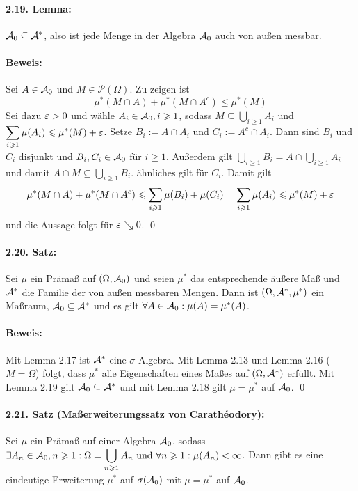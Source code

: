 \paragraph{2.19. Lemma:}$\mathcal{A}_0\subseteq \mathcal{A}^*$, also ist jede Menge in der Algebra $\mathcal{A}_0$ auch von au\ss{}en messbar. 

\paragraph{Beweis:}Sei $A\in\mathcal{A}_0$ und $M\in\mathcal{P}(\Omega)$. Zu zeigen ist
$$\mu^*(M\cap A)+\mu^*(M\cap A^c)\leq\mu^*(M)$$
Sei dazu $\varepsilon>0$ und w\"ahle $A_i\in\mathcal{A}_0,i\geqslant1$, sodass $M\subseteq\displaystyle\bigcup_{i\geq1}A_i$ und $\displaystyle\sum_{i\geqslant1}\mu(A_i)\leqslant\mu^*(M)+\varepsilon$. Setze $B_i:=A\cap A_i$ und $C_i:=A^c\cap A_i$. Dann sind $B_i$ und $C_i$ disjunkt und $B_i,C_i\in\mathcal{A}_0$ f\"ur $i\geq1$. Au\ss{}erdem gilt $\displaystyle\bigcup_{i\geq1}B_i=A\cap\bigcup_{i\geq1}A_i$ und damit $A\cap M\subseteq \displaystyle\bigcup_{i\geq1}B_i$. \"ahnliches gilt f\"ur $C_i$. Damit gilt
$$\mu^*(M\cap A)+\mu^*(M\cap A^c)\leqslant\sum_{i\geqslant1}\mu(B_i)+\mu(C_i)=\sum_{i\geqslant1}\mu(A_i)\leqslant\mu^*(M)+\varepsilon$$
und die Aussage folgt f\"ur $\varepsilon\searrow 0$. \qed

\paragraph{2.20. Satz:}Sei $\mu$ ein Pr\"ama\ss{} auf $(\Omega,\mathcal{A}_0)$ und seien $\mu^*$ das entsprechende \"au\ss{}ere Ma\ss{} und $\mathcal{A}^*$ die Familie der von au\ss{}en messbaren Mengen. Dann ist $(\Omega,\mathcal{A}^*,\mu^*)$ ein Ma\ss{}raum, $\mathcal{A}_0\subseteq\mathcal{A}^*$ und es gilt $\forall A\in\mathcal{A}_0:\mu(A)=\mu^*(A)$. 

\paragraph{Beweis:}Mit Lemma 2.17 ist $\mathcal{A}^*$ eine $\sigma$-Algebra. Mit Lemma 2.13 und Lemma 2.16 ($M=\Omega$) folgt, dass $\mu^*$ alle Eigenschaften eines Ma\ss{}es auf $(\Omega,\mathcal{A}^*)$ erf\"ullt. Mit Lemma 2.19 gilt $\mathcal{A}_0\subseteq\mathcal{A}^*$ und mit Lemma 2.18 gilt $\mu=\mu^*$ auf $\mathcal{A}_0$. \qed

\paragraph{2.21. Satz (Ma\ss{}erweiterungssatz von Carath\'eodory):}Sei $\mu$ ein Pr\"ama\ss{} auf einer Algebra $\mathcal{A}_0$, sodass $\exists A_n\in\mathcal{A}_0,n\geqslant1:\Omega=\displaystyle\bigcup_{n\geqslant1}A_n\text{ und }\forall n\geqslant1:\mu(A_n)<\infty$. Dann gibt es eine eindeutige Erweiterung $\mu^*$ auf $\sigma(\mathcal{A}_0)$ mit $\mu=\mu^*$ auf $\mathcal{A}_0$.

